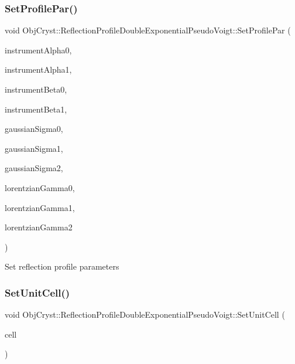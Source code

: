\subsubsection{\texorpdfstring{SetProfilePar()}{SetProfilePar()}}
{\footnotesize\ttfamily void Obj\+Cryst\+::\+Reflection\+Profile\+Double\+Exponential\+Pseudo\+Voigt\+::\+Set\+Profile\+Par (\begin{DoxyParamCaption}\item[{const R\+E\+AL}]{instrument\+Alpha0,  }\item[{const R\+E\+AL}]{instrument\+Alpha1,  }\item[{const R\+E\+AL}]{instrument\+Beta0,  }\item[{const R\+E\+AL}]{instrument\+Beta1,  }\item[{const R\+E\+AL}]{gaussian\+Sigma0,  }\item[{const R\+E\+AL}]{gaussian\+Sigma1,  }\item[{const R\+E\+AL}]{gaussian\+Sigma2,  }\item[{const R\+E\+AL}]{lorentzian\+Gamma0,  }\item[{const R\+E\+AL}]{lorentzian\+Gamma1,  }\item[{const R\+E\+AL}]{lorentzian\+Gamma2 }\end{DoxyParamCaption})}

Set reflection profile parameters \mbox{\label{class_obj_cryst_1_1_reflection_profile_double_exponential_pseudo_voigt_a917d6e23b96ac2a9ffc4b9e45002d505}} 
\subsubsection{\texorpdfstring{SetUnitCell()}{SetUnitCell()}}
{\footnotesize\ttfamily void Obj\+Cryst\+::\+Reflection\+Profile\+Double\+Exponential\+Pseudo\+Voigt\+::\+Set\+Unit\+Cell (\begin{DoxyParamCaption}\item[{const \mbox{\hyperlink{class_obj_cryst_1_1_unit_cell}{Unit\+Cell}} \&}]{cell }\end{DoxyParamCaption})}

